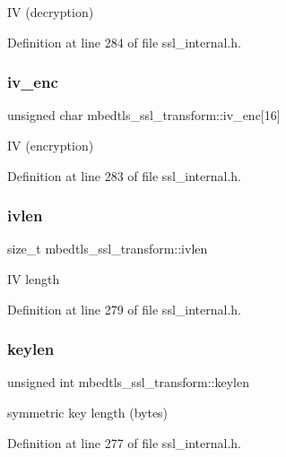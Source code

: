 IV (decryption) 

Definition at line 284 of file ssl\+\_\+internal.\+h.

\mbox{\label{structmbedtls__ssl__transform_a5dc42f2d1f720d396c35eb355cba69e2}} 
\subsubsection{\texorpdfstring{iv\+\_\+enc}{iv\_enc}}
{\footnotesize\ttfamily unsigned char mbedtls\+\_\+ssl\+\_\+transform\+::iv\+\_\+enc\mbox{[}16\mbox{]}}

IV (encryption) 

Definition at line 283 of file ssl\+\_\+internal.\+h.

\mbox{\label{structmbedtls__ssl__transform_aabfe6c0fea0a8bcaa89823c2f06d885a}} 
\subsubsection{\texorpdfstring{ivlen}{ivlen}}
{\footnotesize\ttfamily size\+\_\+t mbedtls\+\_\+ssl\+\_\+transform\+::ivlen}

IV length 

Definition at line 279 of file ssl\+\_\+internal.\+h.

\mbox{\label{structmbedtls__ssl__transform_aacb827d7f8a0d31359870c64d213baa9}} 
\subsubsection{\texorpdfstring{keylen}{keylen}}
{\footnotesize\ttfamily unsigned int mbedtls\+\_\+ssl\+\_\+transform\+::keylen}

symmetric key length (bytes) 

Definition at line 277 of file ssl\+\_\+internal.\+h.

